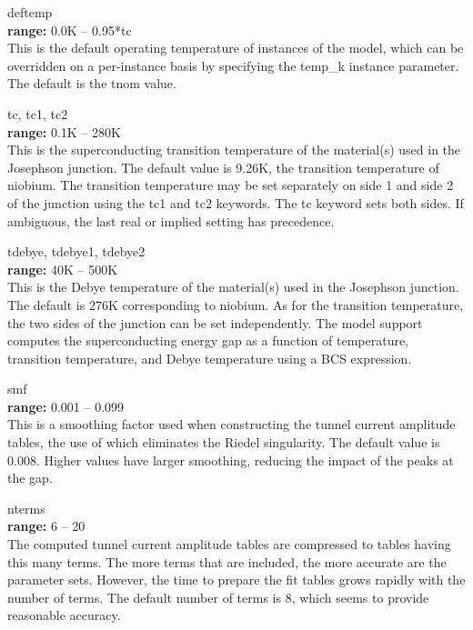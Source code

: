 \begin{description}
\item{\vt deftemp}\\
{\bf range:} 0.0K -- 0.95*{\vt tc}\\
This is the default operating temperature of instances of the model,
which can be overridden on a per-instance basis by specifying the
{\vt temp\_k} instance parameter.  The default is the {\vt tnom}
value.

\item{\vt tc}, {\vt tc1}, {\vt tc2}\\
{\bf range:} 0.1K -- 280K\\
This is the superconducting transition temperature of the material(s)
used in the Josephson junction.  The default value is 9.26K, the
transition temperature of niobium.  The transition temperature may be
set separately on side 1 and side 2 of the junction using the {\vt
tc1} and {\vt tc2} keywords.  The {\vt tc} keyword sets both sides. 
If ambiguous, the last real or implied setting has precedence.

\item{\vt tdebye}, {\vt tdebye1}, {\vt tdebye2}\\
{\bf range:} 40K -- 500K\\
This is the Debye temperature of the material(s) used in the Josephson
junction.  The default is 276K corresponding to niobium.  As for the
transition temperature, the two sides of the junction can be set
independently.  The model support computes the superconducting energy
gap as a function of temperature, transition temperature, and Debye
temperature using a BCS expression.

\item{\vt smf}\\
{\bf range:} 0.001 -- 0.099\\
This is a smoothing factor used when constructing the tunnel current
amplitude tables, the use of which eliminates the Riedel singularity. 
The default value is 0.008.  Higher values have larger smoothing,
reducing the impact of the peaks at the gap.

\item{\vt nterms}\\
{\bf range:} 6 -- 20\\
The computed tunnel current amplitude tables are compressed to tables
having this many terms.  The more terms that are included, the more
accurate are the parameter sets.  However, the time to prepare the fit
tables grows rapidly with the number of terms.  The default number of
terms is 8, which seems to provide reasonable accuracy.


\end{description}
